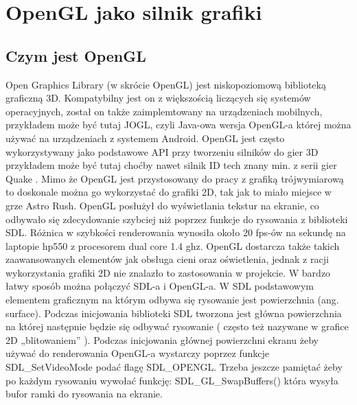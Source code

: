 \section{OpenGL jako silnik grafiki}

\subsection{Czym jest OpenGL}
Open Graphics Library (w skrócie OpenGL) jest niskopoziomową biblioteką  graficzną 3D. Kompatybilny jest on z większością liczących się systemów
operacyjnych, został on także zaimplemtowany na urządzeniach mobilnych, przykładem może być tutaj JOGL, czyli Java-owa wersja OpenGL-a której można
używać na urządzeniach z systemem Android. OpenGL jest często wykorzystywany jako podstawowe API przy tworzeniu silników do gier 3D przykładem może
być tutaj choćby nawet silnik ID tech znany min. z serii gier Quake . Mimo że OpenGL jest przystosowany do pracy z grafiką trójwymiarową to doskonale
można go wykorzystać do grafiki 2D, tak jak to miało miejsce w grze Astro Rush. OpenGL posłużył do wyświetlania tekstur na ekranie, co odbywało się
zdecydowanie szybciej niż poprzez funkcje do rysowania z biblioteki SDL.  Różnica w szybkości renderowania wynosiła około 20 fps-ów na sekundę na
laptopie hp550 z procesorem dual core 1.4 ghz. OpenGL dostarcza także takich zaawansowanych elementów jak obsługa cieni oraz oświetlenia, jednak z
racji wykorzystania grafiki 2D nie znalazło to zastosowania w projekcie.
	W bardzo łatwy sposób można połączyć SDL-a i OpenGL-a.
W SDL podstawowym elementem graficznym na którym odbywa się rysowanie jest powierzchnia (ang. surface). Podczas inicjowania biblioteki SDL tworzona
jest główna powierzchnia na której następnie będzie się odbywać rysowanie ( często też nazywane w grafice 2D „blitowaniem” ). Podczas inicjowania
głównej powierzchni ekranu żeby używać do renderowania OpenGL-a wystarczy poprzez funkcje SDL\_SetVideoMode podać flagę SDL\_OPENGL. Trzeba jeszcze
pamiętać żeby po każdym rysowaniu wywołać funkcję: SDL\_GL\_SwapBuffers() która wysyła bufor ramki do rysowania na ekranie.


